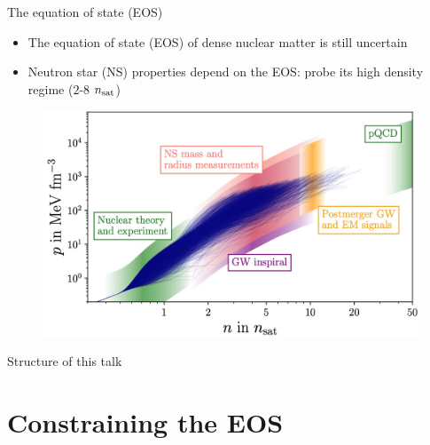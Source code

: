 \documentclass[usenames,dvipsnames,t]{beamer}
\begin{document}
\begin{frame}{The equation of state (EOS)}
  \def\x{2mm}
  \def\y{2mm}

  \begin{itemize}
    \item The equation of state (EOS) of dense nuclear matter is still uncertain~\cite{Koehn:2024set}

    \vspace{\x}

    \item Neutron star (NS) properties depend on the EOS: probe its high density regime ($2$-$8$ $n_{\rm{sat}}$)
  \end{itemize}

  \vspace{\x}

  \begin{figure}
    \centering
    \includegraphics[width=0.75\linewidth]{Figures/Koehn_EOS.jpg} 
  \end{figure}
\end{frame}

\begin{frame}{Structure of this talk}
  
\end{frame}

\section{Constraining the EOS}
\end{document}
